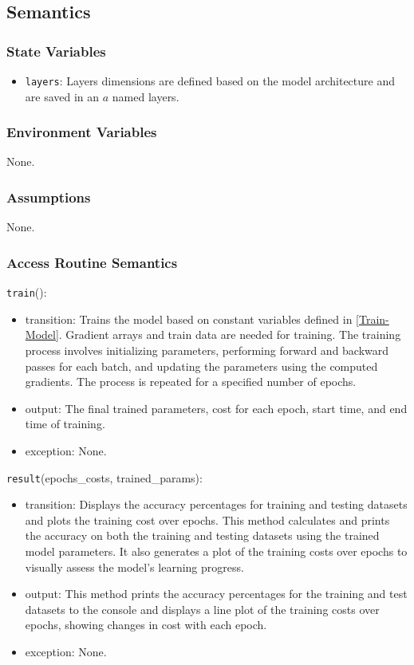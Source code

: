 \documentclass[12pt, titlepage]{article}
\def\code#1{\texttt{#1}}
\begin{document}
\subsection{Semantics}

\subsubsection{State Variables}
\begin{itemize}
  \item \code{layers}: Layers dimensions are defined based on the 
  model architecture and are saved in an ${a}$ named layers.
\end{itemize}

\subsubsection{Environment Variables}
None.

\subsubsection{Assumptions}
None.

\subsubsection{Access Routine Semantics}

\noindent \code{train}():
\begin{itemize}
  \item transition: Trains the model based on constant variables defined in \ref{Train-Model}. 
  Gradient arrays and train data are needed for training. 
  The training process involves initializing parameters, performing forward and backward 
  passes for each batch, and updating the parameters using the computed gradients. The 
  process is repeated for a specified number of epochs.
  \item output: The final trained parameters, cost for each epoch, 
  start time, and end time of training.
  \item exception: None.
\end{itemize}

\noindent \code{result}(epochs\_costs, trained\_params):
\begin{itemize}
  \item transition: Displays the accuracy percentages for training and testing 
  datasets and plots the training cost over epochs.
  This method calculates and prints the accuracy on both the 
  training and testing datasets using the trained model parameters. 
  It also generates a plot of the training costs over epochs to 
  visually assess the model's learning progress.
  \item output: This method prints the accuracy percentages for 
  the training and test datasets to the console and
  displays a line plot of the training costs over 
  epochs, showing changes in cost with each epoch.
  \item exception: None.
\end{itemize}
\end{document}
